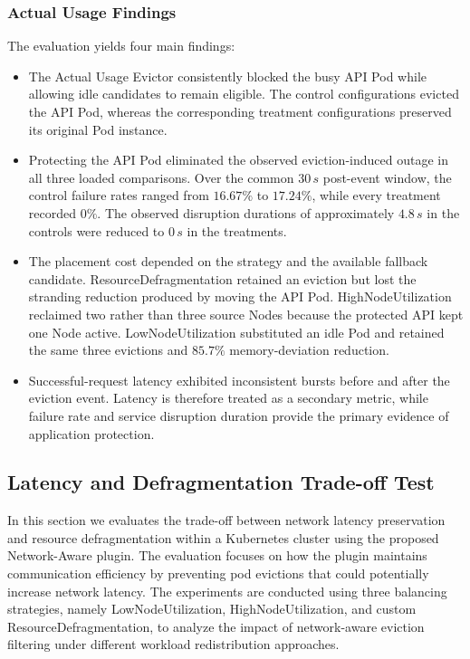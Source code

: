 \subsubsection{Actual Usage Findings}
\label{subsec:actualusage4_findings}
The evaluation yields four main findings:

\begin{itemize}
    \item The Actual Usage Evictor consistently blocked the busy API Pod while allowing idle candidates to remain eligible. The control configurations evicted the API Pod, whereas the corresponding treatment configurations preserved its original Pod instance.
    \item Protecting the API Pod eliminated the observed eviction-induced outage in all three loaded comparisons. Over the common \(30\,s\) post-event window, the control failure rates ranged from \(16.67\%\) to \(17.24\%\), while every treatment recorded \(0\%\). The observed disruption durations of approximately \(4.8\,s\) in the controls were reduced to \(0\,s\) in the treatments.
    \item The placement cost depended on the strategy and the available fallback candidate. ResourceDefragmentation retained an eviction but lost the stranding reduction produced by moving the API Pod. HighNodeUtilization reclaimed two rather than three source Nodes because the protected API kept one Node active. LowNodeUtilization substituted an idle Pod and retained the same three evictions and \(85.7\%\) memory-deviation reduction.
    \item Successful-request latency exhibited inconsistent bursts before and after the eviction event. Latency is therefore treated as a secondary metric, while failure rate and service disruption duration provide the primary evidence of application protection.
\end{itemize}

\subsection{Latency and Defragmentation Trade-off Test}
\label{sec:netaware4_test}
In this section we evaluates the trade-off between network latency preservation and resource defragmentation within a Kubernetes cluster using the proposed Network-Aware plugin. The evaluation focuses on how the plugin maintains communication efficiency by preventing pod evictions that could potentially increase network latency. The experiments are conducted using three balancing strategies, namely LowNodeUtilization, HighNodeUtilization, and custom ResourceDefragmentation, to analyze the impact of network-aware eviction filtering under different workload redistribution approaches.


